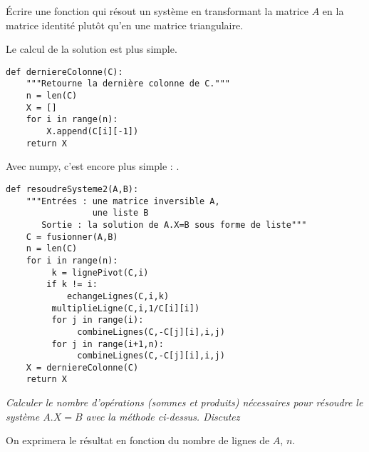 \begin{Exercise}[label=exo:inv,title=Autre résolution]\it

Écrire une fonction qui résout un système en transformant la matrice $A$ en la matrice identité plutôt qu'en une matrice triangulaire.

\end{Exercise}
\begin{Answer} Le calcul de la solution est plus simple.
\begin{lstlisting}
def derniereColonne(C):
    """Retourne la dernière colonne de C."""
    n = len(C)
    X = []
    for i in range(n): 
        X.append(C[i][-1])
    return X
\end{lstlisting}
Avec numpy, c'est encore plus simple : .

\newpage
\begin{lstlisting}
def resoudreSysteme2(A,B):
    """Entrées : une matrice inversible A, 
                 une liste B
       Sortie : la solution de A.X=B sous forme de liste"""
    C = fusionner(A,B)
    n = len(C)
    for i in range(n):
         k = lignePivot(C,i)
        if k != i: 
            echangeLignes(C,i,k)
         multiplieLigne(C,i,1/C[i][i])
         for j in range(i):
              combineLignes(C,-C[j][i],i,j)
         for j in range(i+1,n):
              combineLignes(C,-C[j][i],i,j)
    X = derniereColonne(C)
    return X
\end{lstlisting}
\end{Answer}
\begin{Exercise}[label=exo:nbcalc,title=Complexité]\it
Calculer le nombre d'opérations (sommes et produits) nécessaires pour résoudre le système $A.X=B$ avec la méthode ci-dessus. Discutez

On exprimera le résultat en fonction du nombre de lignes de $A$, $n$.
\end{Exercise}
